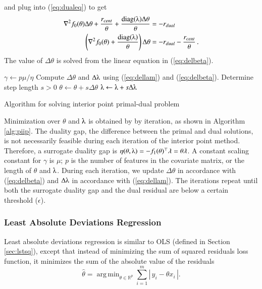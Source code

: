 \documentclass[11pt]{article}
\DeclareMathOperator*{\argmin}{arg\,min}
\begin{document}
and plug into (\ref{eq:dualeq}) to get
\begin{align}
\nabla^2f_0(\theta)\Delta\theta +\frac{r_{cent}}{\theta} + \frac{\text{diag}(\lambdaup)\Delta\theta}{\theta} &= -r_{dual}\nonumber\\ 
\left(\nabla^2f_0(\theta) + \frac{\text{diag}(\lambdaup)}{\theta}\right)\Delta\theta &= -r_{dual} - \frac{r_{cent}}{\theta}\,.\label{eq:delbeta}
\end{align}
The value of $\Delta\theta$ is solved from the linear equation in (\ref{eq:delbeta}).

\begin{algorithm}\begingroup\fontsize{10}{10}\selectfont
\begin{algorithmic}
\State
{}
	\State $\gamma \gets p\mu/\eta$
	\State Compute $\Delta\theta$ and $\Delta\lambdaup$ using (\ref{eq:dellam}) and (\ref{eq:delbeta}).
	\State Determine step length $s>0$
	\State $\theta \gets \theta + s\Delta\theta$
	\State $\lambdaup \gets \lambdaup + s\Delta\lambdaup$
\EndWhile
\end{algorithmic}\endgroup\caption{Algorithm for solving interior point primal-dual problem}\label{alg:piip}
\end{algorithm} 

Minimization over $\theta$ and $\lambdaup$ is obtained by by iteration, as shown in Algorithm \ref{alg:piip}. The duality gap, the difference between the primal and dual solutions, is not necessarily feasible during each iteration of the interior point method. Therefore, a surrogate duality gap is $\eta(\theta, \lambdaup) = -f_1(\theta)^\top\lambda = \theta\lambda$. A constant scaling constant for $\gamma$ is $\mu$; $p$ is the number of features in the covariate matrix, or the length of $\theta$ and $\lambdaup$. During each iteration, we update $\Delta\theta$ in accordance with (\ref{eq:delbeta}) and $\Delta\lambdaup$ in accordance with (\ref{eq:dellam}). The iterations repeat until both the surrogate duality gap and the dual residual are below a certain threshold ($\epsilon$).

\subsubsection{Least Absolute Deviations Regression} \label{sec:lad}

Least absolute deviations regression is similar to OLS (defined in Section \ref{sec:lstsq}), except that instead of minimizing the sum of squared residuals loss function, it minimizes the sum of the absolute value of the residuals
\[\hat{\theta} = \argmin_{\theta\in\mathbb{R}^p}\sum_{i=1}^m \left|\,y_i - \theta x_i\,\right|.\]
\end{document}
